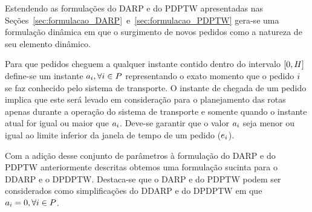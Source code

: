 Estendendo as formulações do DARP e do PDPTW apresentadas nas
Seções~\ref{sec:formulacao_DARP}~e~\ref{sec:formulacao_PDPTW} gera-se uma
formulação dinâmica em que o surgimento de novos pedidos como a natureza de 
seu elemento dinâmico.

Para que pedidos cheguem a qualquer instante contido dentro
do intervalo $[0, H]$ define-se um instante 
$a_i, \forall i \in P$ representando 
o exato momento que o pedido $i$ se faz conhecido pelo sistema de 
transporte.
O instante de chegada de um pedido implica que este será levado
em consideração para o planejamento das rotas apenas durante a
operação do sistema de transporte e somente quando o instante atual for
igual ou maior que $a_i$.
Deve-se garantir que o valor $a_i$ seja menor ou igual ao 
limite inferior da janela de tempo de um pedido 
($e_i$).

Com a adição desse conjunto de parâmetros à formulação do DARP e do PDPTW
anteriormente descritas obtemos uma formulação sucinta para o DDARP e o DPDPTW.
Destaca-se que o DARP e do PDPTW podem ser considerados como simplificações do
DDARP e do DPDPTW em que $a_i = 0, \forall i \in
P$.

